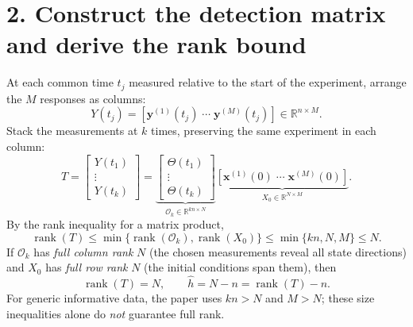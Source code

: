 \documentclass[10pt,a4paper]{article}
\begin{document}
\section{2. Construct the detection matrix and derive the rank bound}
At each common time $t_j$ measured relative to the start of the experiment, arrange the $M$ responses as columns:
\[
 Y(t_j)=[\mathbf y^{(1)}(t_j)\;\cdots\;\mathbf y^{(M)}(t_j)]
 \in\mathbb R^{n\times M}.
\]
Stack the measurements at $k$ times, preserving the same experiment in each column:
\begin{equation}
\boxed{T=\begin{bmatrix}Y(t_1)\\\vdots\\Y(t_k)\end{bmatrix}}
=\underbrace{\begin{bmatrix}\Theta(t_1)\\\vdots\\\Theta(t_k)\end{bmatrix}}_{\mathcal O_k\in\mathbb R^{kn\times N}}
\underbrace{[\mathbf x^{(1)}(0)\;\cdots\;\mathbf x^{(M)}(0)]}_{X_0\in\mathbb R^{N\times M}}.
\tag{4}
\end{equation}
By the rank inequality for a matrix product,
\begin{equation}
\operatorname{rank}(T)\le\min\{\operatorname{rank}(\mathcal O_k),
\operatorname{rank}(X_0)\}\le\min\{kn,N,M\}\le N.\tag{5}
\end{equation}
If $\mathcal O_k$ has \emph{full column rank} $N$ (the chosen measurements reveal all state directions) and $X_0$ has \emph{full row rank} $N$ (the initial conditions span them), then
\begin{equation}
\boxed{\operatorname{rank}(T)=N,\qquad \widehat h=N-n=\operatorname{rank}(T)-n.}\tag{6}
\end{equation}
For generic informative data, the paper uses $kn>N$ and $M>N$; these size inequalities alone do \emph{not} guarantee full rank.

\newpage
\end{document}
